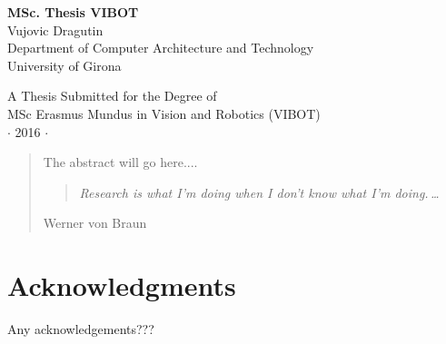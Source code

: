 
\newpage
\thispagestyle{empty}


\vspace*{2cm}
\begin{center}
{\Large\bf MSc. Thesis VIBOT\\} \vspace{2cm} {\large
Vujovic Dragutin\\
\vspace{2cm}
Department of Computer Architecture and Technology \\
University of Girona}

\end{center}

\vspace{7cm}
\begin{center}
{\large A Thesis Submitted for the Degree of \\MSc Erasmus Mundus
in Vision and Robotics (VIBOT) \\\vspace{0.3cm} $\cdot$ 2016
$\cdot$}
\end{center}
\singlespacing


\begin{abstract}
The abstract will go here....

\vspace*{5cm}



\begin{center}
\begin{quote}
\it Research is what I'm doing when I don't know what I'm
doing.\,\ldots
\end{quote}
\end{center}
\hfill{\small Werner von Braun}

\end{abstract}

\doublespacing

\setcounter{page}{1} \pagestyle{plain}


\tableofcontents

\listoffigures
\listoftables

\chapter*{Acknowledgments}
         {\protect{}}

Any acknowledgements???

\pagestyle{fancy}
